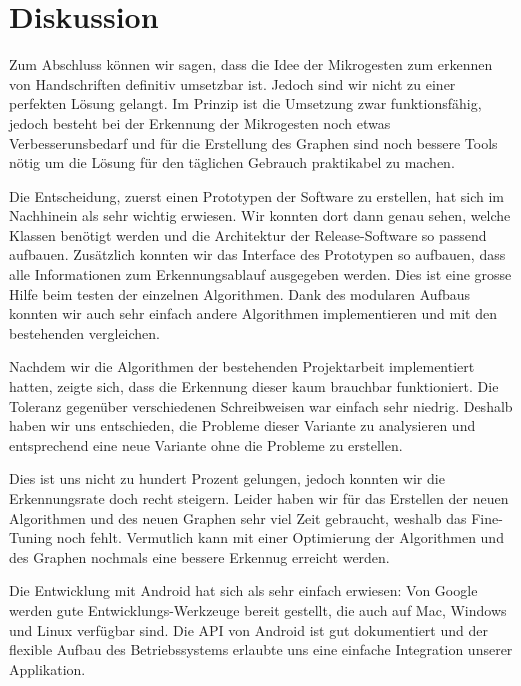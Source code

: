 \chapter{Diskussion}
Zum Abschluss können wir sagen, dass die Idee der Mikrogesten zum erkennen von Handschriften definitiv umsetzbar ist. Jedoch sind wir nicht zu einer perfekten Lösung gelangt. Im Prinzip ist die Umsetzung zwar funktionsfähig, jedoch besteht bei der Erkennung der Mikrogesten noch etwas Verbesserunsbedarf und für die Erstellung des Graphen sind noch bessere Tools nötig um die Lösung für den täglichen Gebrauch praktikabel zu machen.

Die Entscheidung, zuerst einen Prototypen der Software zu erstellen, hat sich im Nachhinein als sehr wichtig erwiesen. Wir konnten dort dann genau sehen, welche Klassen benötigt werden und die Architektur der Release-Software so passend aufbauen. Zusätzlich konnten wir das Interface des Prototypen so aufbauen, dass alle Informationen zum Erkennungsablauf ausgegeben werden. Dies ist eine grosse Hilfe beim testen der einzelnen Algorithmen. Dank des modularen Aufbaus konnten wir auch sehr einfach andere Algorithmen implementieren und mit den bestehenden vergleichen.

Nachdem wir die Algorithmen der bestehenden Projektarbeit implementiert hatten, zeigte sich, dass die Erkennung dieser kaum brauchbar funktioniert. Die Toleranz gegenüber verschiedenen Schreibweisen war einfach sehr niedrig. Deshalb haben wir uns entschieden, die Probleme dieser Variante zu analysieren und entsprechend eine neue Variante ohne die Probleme zu erstellen.

Dies ist uns nicht zu hundert Prozent gelungen, jedoch konnten wir die Erkennungsrate doch recht steigern. Leider haben wir für das Erstellen der neuen Algorithmen und des neuen Graphen sehr viel Zeit gebraucht, weshalb das Fine-Tuning noch fehlt. Vermutlich kann mit einer Optimierung der Algorithmen und des Graphen nochmals eine bessere Erkennug erreicht werden.



Die Entwicklung mit Android hat sich als sehr einfach erwiesen: Von Google werden gute Entwicklungs-Werkzeuge bereit gestellt, die auch auf Mac, Windows und Linux verfügbar sind. Die API von Android ist gut dokumentiert und der flexible Aufbau des Betriebssystems erlaubte uns eine einfache Integration unserer Applikation. 